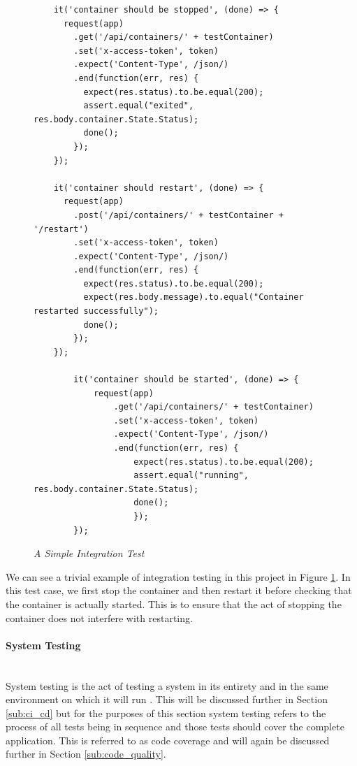 \begin{figure}[!ht]
\begin{lstlisting}
	it('container should be stopped', (done) => {
      request(app)
        .get('/api/containers/' + testContainer)
        .set('x-access-token', token)
        .expect('Content-Type', /json/)
        .end(function(err, res) {
          expect(res.status).to.be.equal(200);
          assert.equal("exited", res.body.container.State.Status);
          done();
        });
    });

    it('container should restart', (done) => {
      request(app)
        .post('/api/containers/' + testContainer + '/restart')
        .set('x-access-token', token)
        .expect('Content-Type', /json/)
        .end(function(err, res) {
          expect(res.status).to.be.equal(200);
          expect(res.body.message).to.equal("Container restarted successfully");
          done();
        });
    });
		
		it('container should be started', (done) => {
			request(app)
				.get('/api/containers/' + testContainer)
				.set('x-access-token', token)
				.expect('Content-Type', /json/)
				.end(function(err, res) {
					expect(res.status).to.be.equal(200);
					assert.equal("running", res.body.container.State.Status);
					done();
					});
		});
\end{lstlisting}
\caption{\em A Simple Integration Test}
\label{fig:integration_test}
\end{figure}

We can see a trivial example of integration testing in this project in Figure \ref{fig:integration_test}. In this test case, we first stop the container and then restart it before checking that the container is actually started. This is to ensure that the act of stopping the container does not interfere with restarting.

\paragraph{System Testing}\mbox{}\\
System testing is the act of testing a system in its entirety and in the same environment on which it will run \citep{SystemTesting2017}. This will be discussed further in Section \ref{sub:ci_cd} but for the purposes of this section system testing refers to the process of all tests being in sequence and those tests should cover the complete application. This is referred to as \gls{code coverage} and will again be discussed further in Section \ref{sub:code_quality}. 

